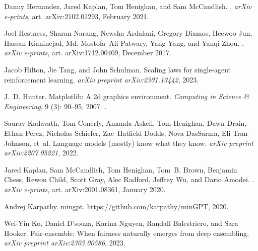 \documentclass{article} %
\begin{document}
\begin{thebibliography}{61}
Danny {Hernandez}, Jared {Kaplan}, Tom {Henighan}, and Sam {McCandlish}.
.
\newblock \emph{arXiv e-prints}, art. arXiv:2102.01293, February 2021.

Joel {Hestness}, Sharan {Narang}, Newsha {Ardalani}, Gregory {Diamos}, Heewoo
  {Jun}, Hassan {Kianinejad}, Md. Mostofa~Ali {Patwary}, Yang {Yang}, and Yanqi
  {Zhou}.
.
\newblock \emph{arXiv e-prints}, art. arXiv:1712.00409, December 2017.

Jacob Hilton, Jie Tang, and John Schulman.
\newblock Scaling laws for single-agent reinforcement learning.
\newblock \emph{arXiv preprint arXiv:2301.13442}, 2023.

J.~D. Hunter.
\newblock Matplotlib: A 2d graphics environment.
\newblock \emph{Computing in Science \& Engineering}, 9 (3):
  90--95, 2007.
\newblock {}.

Saurav Kadavath, Tom Conerly, Amanda Askell, Tom Henighan, Dawn Drain, Ethan
  Perez, Nicholas Schiefer, Zac~Hatfield Dodds, Nova DasSarma, Eli
  Tran-Johnson, et~al.
\newblock Language models (mostly) know what they know.
\newblock \emph{arXiv preprint arXiv:2207.05221}, 2022.

Jared {Kaplan}, Sam {McCandlish}, Tom {Henighan}, Tom~B. {Brown}, Benjamin
  {Chess}, Rewon {Child}, Scott {Gray}, Alec {Radford}, Jeffrey {Wu}, and Dario
  {Amodei}.
.
\newblock \emph{arXiv e-prints}, art. arXiv:2001.08361, January 2020.

Andrej Karpathy.
\newblock mingpt.
\newblock \url{https://github.com/karpathy/minGPT}, 2020.

Wei-Yin Ko, Daniel D'souza, Karina Nguyen, Randall Balestriero, and Sara
  Hooker.
\newblock Fair-ensemble: When fairness naturally emerges from deep ensembling.
\newblock \emph{arXiv preprint arXiv:2303.00586}, 2023.


\end{thebibliography}
\end{document}
